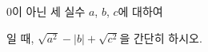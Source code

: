 $0$이 아닌 세 실수 $a$, $b$, $c$에 대하여\par\smallskip{}\par\smallskip\noindent 일 때, $\sqrt{a^2}-|b|+\sqrt{c^2}$을 간단히 하시오.
